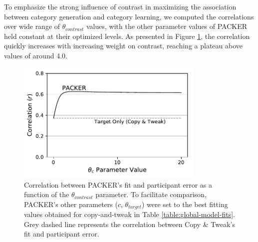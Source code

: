 To emphasize the strong influence of contrast in maximizing the association
between category generation and category learning, we computed the correlations
over wide range of $\theta_{contrast}$ values, with the other parameter values
of PACKER held constant at their optimized levels. As presented in Figure
\ref{fig:packer-corr}, the correlation quickly increases with increasing weight
on contrast, reaching a plateau above values of around 4.0.

\begin{figure}
    \begin{center}
    \includegraphics[width=0.8\textwidth]{figs/packer-corr.pdf}
    \caption{Correlation between PACKER's fit and participant error as a
function of the $\theta_{contrast}$ parameter. To facilitate comparison,
PACKER's other parameters ($c$, $\theta_{target}$) were set to the best fitting
values obtained for copy-and-tweak in Table \ref{table:global-model-fits}. Grey
dashed line represents the correlation between Copy \& Tweak's fit and
participant error.}
    \label{fig:packer-corr}
    \end{center}
\end{figure}













